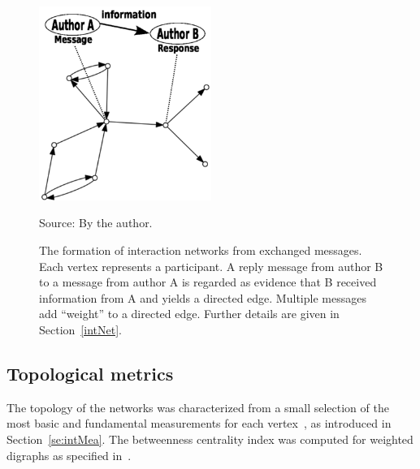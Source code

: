 \begin{figure}[!h]
\centering
\includegraphics[width=0.5\textwidth]{figs/criaRede3_}
\caption{The formation of interaction networks from exchanged messages. Each vertex represents a participant. A reply message from author B to a message from author A is regarded as evidence that B received information from A and yields a directed edge. Multiple messages add ``weight'' to a directed edge. Further details are given in Section~\ref{intNet}.}
\label{formationNetwork}
\begin{flushleft}\footnotesize
Source: By the author.\
\end{flushleft}
\end{figure}


\subsection{Topological metrics}\label{measures}

The topology of the networks was characterized 
from a small selection of the most basic 
and fundamental measurements for each vertex~\cite{newmanBook},
as introduced in Section~\ref{se:intMea}.
The betweenness centrality index was computed for weighted digraphs as specified in~\cite{faster}.

